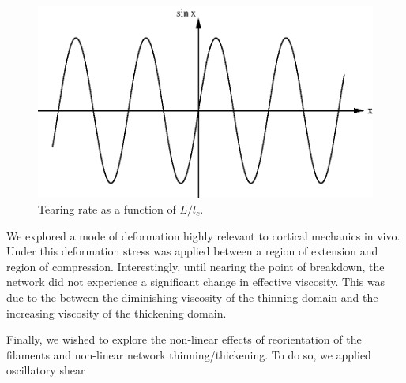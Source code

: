 \documentclass[pre,reprint]{revtex4-1}
\begin{document}
\begin{figure}[h!]
\centering
\includegraphics[scale=0.6]{sine}
\caption{\label{fig:tear}Tearing rate as a function of $L/l_c$.}
\end{figure}

We explored a mode of deformation highly relevant to cortical mechanics in vivo.  Under this deformation stress was applied between a region of extension and region of compression.  Interestingly, until nearing the point of breakdown, the network did not experience a significant change in effective viscosity.  This was due to the between the diminishing viscosity of the thinning domain and the increasing viscosity of the thickening domain.  


Finally, we wished to explore the non-linear effects of reorientation of the filaments and non-linear network thinning/thickening.  To do so, we applied oscillatory shear 
\end{document}
